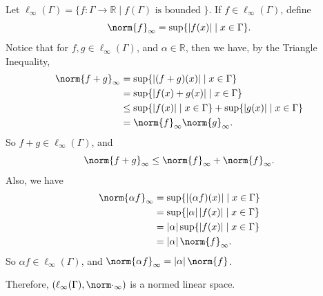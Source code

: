 \documentclass[notoc,notitlepage]{tufte-book}
\begin{document}
\begin{eg}\label{eg:l_infty_on_gamma}
  Let $\ell_\infty(\Gamma) = \{ f : \Gamma \to \mathbb{R} \mid f(\Gamma) \text{ is bounded } \}$. If $f \in \ell_\infty(\Gamma)$, define
  \begin{equation*}
    \norm{f}_\infty = \sup \{ \abs{f(x)} \mid x \in \Gamma \}.
  \end{equation*}
  Notice that for $f, g \in \ell_\infty(\Gamma)$, and $\alpha \in \mathbb{R}$, then we have, by the Triangle Inequality,
  \begin{align*}
    \norm{f + g}_\infty &= \sup \{ \abs{ (f + g)(x) } \mid x \in \Gamma \} \\
                        &= \sup \{ \abs{ f(x) + g(x) } \mid x \in \Gamma \} \\
                        &\leq \sup \{ \abs{ f(x) } \mid x \in \Gamma \} + \sup \{ \abs{ g(x) } \mid x \in \Gamma \} \\
                        &= \norm{f}_\infty \norm{g}_\infty.
  \end{align*}
  So $f + g \in \ell_\infty(\Gamma)$, and
  \begin{equation*}
    \norm{f + g}_\infty \leq \norm{f}_\infty + \norm{f}_\infty.
  \end{equation*}
  Also, we have
  \begin{align*}
    \norm{\alpha f}_\infty &= \sup \{ \abs{ (\alpha f)(x) } \mid x \in \Gamma \} \\
                           &= \sup \{ \abs{\alpha} \abs{ f(x) } \mid x \in \Gamma \} \\
                           &= \abs{\alpha} \sup \{ \abs{f(x)} \mid x \in \Gamma \} \\
                           &= \abs{\alpha} \norm{f}_\infty.
  \end{align*}
  So $\alpha f \in \ell_\infty(\Gamma)$, and $\norm{\alpha f}_\infty = \abs{\alpha} \norm{f}$.

  Therefore, $(\ell_\infty(\Gamma), \norm\cdot_\infty)$ is a normed linear space.
\end{eg}
\end{document}
